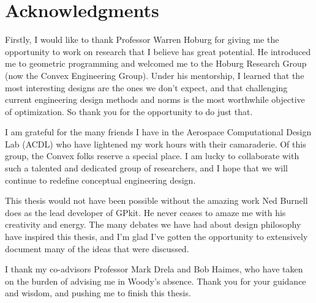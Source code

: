 \cleardoublepage
\setcounter{savepage}{\thepage}
\begin{abstractpage}

\end{abstractpage}

% 

\cleardoublepage

\section*{Acknowledgments}

Firstly, I would like to thank Professor Warren Hoburg for giving me
the opportunity to work on research that I believe has great potential.
He introduced me to geometric programming and welcomed me to the Hoburg Research Group
(now the Convex Engineering Group). Under his mentorship, I learned that the most interesting designs
are the ones we don't expect, and that challenging current engineering design methods and norms
is the most worthwhile objective of optimization.
So thank you for the opportunity to do just that.

I am grateful for the many friends I have in the Aerospace Computational Design
Lab (ACDL) who have lightened my work hours with their camaraderie. Of this group,
the Convex folks reserve a special place. I am lucky to collaborate with
such a talented and dedicated group of researchers, and I hope that we will continue
to redefine conceptual engineering design.

This thesis would not have been possible without the amazing work Ned Burnell does
as the lead developer of GPkit. He never ceases to amaze me with his creativity and energy.
The many debates we have had about design philosophy have inspired this thesis,
and I'm glad I've gotten the opportunity to extensively document many of the ideas
that were discussed.

I thank my co-advisors Professor Mark Drela and Bob Haimes, who have taken on the burden of advising
me in Woody's absence. Thank you for your guidance and wisdom, and pushing me to
finish this thesis.

